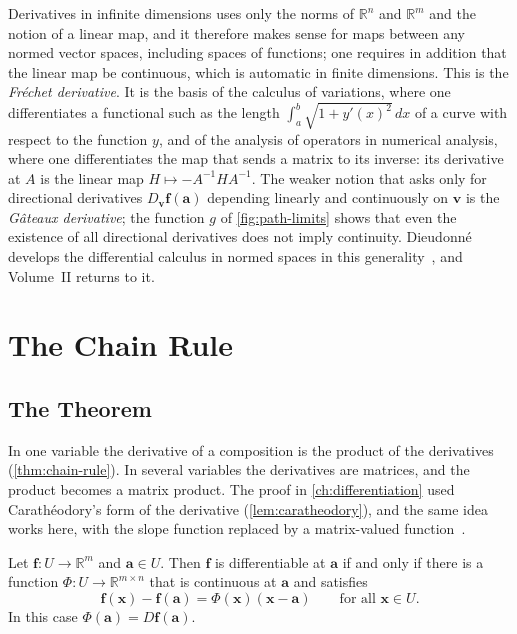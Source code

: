 \begin{note}{Derivatives in infinite dimensions}
 uses only the norms of $\mathbb R^n$ and $\mathbb R^m$ and the notion of a linear map, and it therefore makes sense for maps between any normed vector spaces, including spaces of functions; one requires in addition that the linear map be continuous, which is automatic in finite dimensions. This is the \emph{Fr\'echet derivative}. It is the basis of the calculus of variations, where one differentiates a functional such as the length $\int_a^b\sqrt{1+y'(x)^2}\,dx$ of a curve with respect to the function $y$, and of the analysis of operators in numerical analysis, where one differentiates the map that sends a matrix to its inverse: its derivative at $A$ is the linear map $H\mapsto-A^{-1}HA^{-1}$. The weaker notion that asks only for directional derivatives $D_{\mathbf v}\mathbf f(\mathbf a)$ depending linearly and continuously on $\mathbf v$ is the \emph{G\^ateaux derivative}; the function $g$ of \cref{fig:path-limits} shows that even the existence of all directional derivatives does not imply continuity. Dieudonn\'e develops the differential calculus in normed spaces in this generality~\cite{dieudonne1960}, and Volume~II returns to it.
\end{note}

\section{The Chain Rule}
\label{sec:chain-rule-n}

\subsection{The Theorem}

In one variable the derivative of a composition is the product of the derivatives (\cref{thm:chain-rule}). In several variables the derivatives are matrices, and the product becomes a matrix product. The proof in \cref{ch:differentiation} used Carath\'eodory's form of the derivative (\cref{lem:caratheodory}), and the same idea works here, with the slope function replaced by a matrix-valued function~\cite{acosta1994}.

\begin{lemma}
\label{lem:caratheodory-rn}
Let $\mathbf f\colon U\to\mathbb R^m$ and $\mathbf a\in U$. Then $\mathbf f$ is differentiable at $\mathbf a$ if and only if there is a function $\Phi\colon U\to\mathbb R^{m\times n}$ that is continuous at $\mathbf a$ and satisfies
\[
\mathbf f(\mathbf x)-\mathbf f(\mathbf a)=\Phi(\mathbf x)(\mathbf x-\mathbf a)\qquad\text{for all }\mathbf x\in U .
\]
In this case $\Phi(\mathbf a)=D\mathbf f(\mathbf a)$.
\end{lemma}

